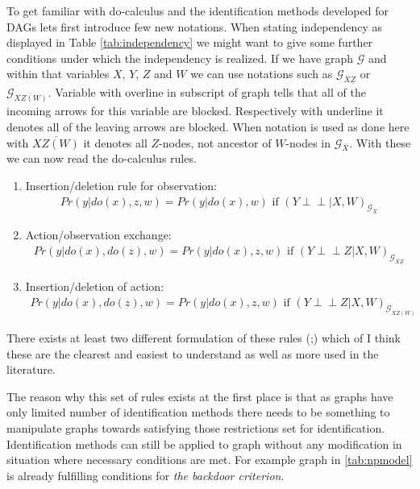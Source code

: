 \documentclass[main=english,12pt,a4paper,pdftex,econ,utf8]{aaltothesis}
\newcommand{\indep}{\perp \!\!\! \perp}
\newcommand{\g}{\mathcal{G}}
\begin{document}
To get familiar with do-calculus and the identification methods developed for DAGs lets first introduce few new notations. When stating independency as displayed in Table \ref{tab:independency} we might want to give some further conditions under which the independency is realized. If we have graph $\g$ and within that variables $X$, $Y$, $Z$ and $W$ we can use notations such as $\g_{\overline{X}\underline{Z}}$ or $\g_{\overline{XZ(W)}}$. Variable with overline in subscript of graph tells that all of the incoming arrows for this variable are blocked. Respectively with underline it denotes all of the leaving arrows are blocked. When notation is used as done here with $\overline{XZ(W)}$ it denotes all $Z$-nodes, not ancestor of $W$-nodes in $\g_{\overline{X}}$. With these we can now read the do-calculus rules.

\begin{enumerate}
    \item Insertion/deletion rule for observation:
        \begin{gather} \label{eq:do1}
            Pr(y|do(x),z,w)=Pr(y|do(x),w)\text{ if }(Y\indep |X,W)_{\g_{\overline{X}}}
        \end{gather}
    \item Action/observation exchange:
        \begin{gather} \label{eq:do2}
            Pr(y|do(x), do(z), w)=Pr(y|do(x),z,w)\text{ if }(Y\indep Z|X,W)_{\g_{\overline{X}\underline{Z}}}
        \end{gather}
    \item Insertion/deletion of action:
        \begin{gather} \label{eq:do3}
            Pr(y|do(x),do(z),w)=Pr(y|do(x),z,w)\text{ if }(Y\indep Z|X,W)_{\g_{\overline{XZ(W)}}}
        \end{gather}
\end{enumerate}

\noindent There exists at least two different formulation of these rules (\cite{Jud1995};\cite{Pearl2009a}) which of I think these are the clearest and easiest to understand as well as more used in the literature.

The reason why this set of rules exists at the first place is that as graphs have only limited number of identification methods there needs to be something to manipulate graphs towards satisfying those restrictions set for identification. Identification methods can still be applied to graph without any modification in situation where necessary conditions are met. For example graph in \ref{tab:npmodel} is already fulfilling conditions for \textit{the backdoor criterion}.
\end{document}
